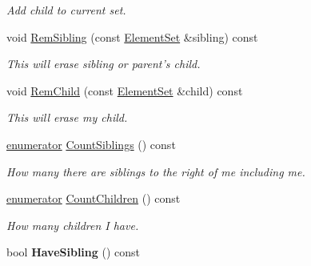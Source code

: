 \begin{DoxyCompactItemize}
\begin{DoxyCompactList}\small\item\em Add child to current set. \end{DoxyCompactList}\item 
\hypertarget{classINMOST_1_1ElementSet_a8993015c5cb4f251d457c0bd02f31596}{void \hyperlink{classINMOST_1_1ElementSet_a8993015c5cb4f251d457c0bd02f31596}{Rem\-Sibling} (const \hyperlink{classINMOST_1_1ElementSet}{Element\-Set} \&sibling) const }\label{classINMOST_1_1ElementSet_a8993015c5cb4f251d457c0bd02f31596}

\begin{DoxyCompactList}\small\item\em This will erase sibling or parent's child. \end{DoxyCompactList}\item 
\hypertarget{classINMOST_1_1ElementSet_aa7b86070ba51b14b5cadcf598f6edb29}{void \hyperlink{classINMOST_1_1ElementSet_aa7b86070ba51b14b5cadcf598f6edb29}{Rem\-Child} (const \hyperlink{classINMOST_1_1ElementSet}{Element\-Set} \&child) const }\label{classINMOST_1_1ElementSet_aa7b86070ba51b14b5cadcf598f6edb29}

\begin{DoxyCompactList}\small\item\em This will erase my child. \end{DoxyCompactList}\item 
\hypertarget{classINMOST_1_1ElementSet_a0e93907cddd2f9486af14f497362f761}{\hyperlink{classINMOST_1_1Storage_ae333dfced6fa9cfde0c8e7dcf1b0cc2b}{enumerator} \hyperlink{classINMOST_1_1ElementSet_a0e93907cddd2f9486af14f497362f761}{Count\-Siblings} () const }\label{classINMOST_1_1ElementSet_a0e93907cddd2f9486af14f497362f761}

\begin{DoxyCompactList}\small\item\em How many there are siblings to the right of me including me. \end{DoxyCompactList}\item 
\hypertarget{classINMOST_1_1ElementSet_abd1a5a15dde363cd7c55d77028902dd5}{\hyperlink{classINMOST_1_1Storage_ae333dfced6fa9cfde0c8e7dcf1b0cc2b}{enumerator} \hyperlink{classINMOST_1_1ElementSet_abd1a5a15dde363cd7c55d77028902dd5}{Count\-Children} () const }\label{classINMOST_1_1ElementSet_abd1a5a15dde363cd7c55d77028902dd5}

\begin{DoxyCompactList}\small\item\em How many children I have. \end{DoxyCompactList}\item 
\hypertarget{classINMOST_1_1ElementSet_a8fb6b18ca91b86090562a412d648caed}{bool {\bfseries Have\-Sibling} () const }\label{classINMOST_1_1ElementSet_a8fb6b18ca91b86090562a412d648caed}


\end{DoxyCompactItemize}
